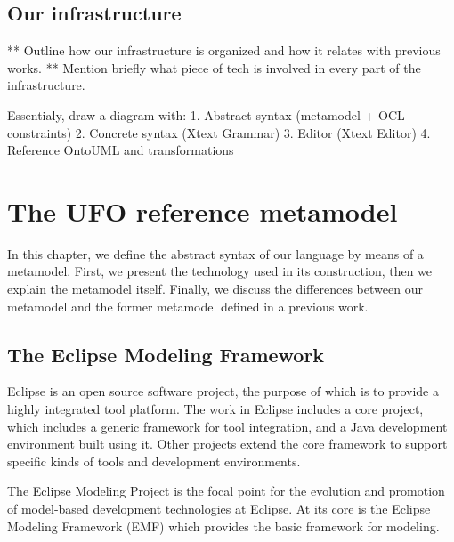 \documentclass[
  10pt,				%
  oneside,
  a4paper,			%
  brazilian,
  english
]{abntex2}
\begin{document}
%

\section{Our infrastructure}

** Outline how our infrastructure is organized and how it relates with previous works.
** Mention briefly what piece of tech is involved in every part of the infrastructure.

Essentialy, draw a diagram with:
1. Abstract syntax (metamodel + OCL constraints)
2. Concrete syntax (Xtext Grammar)
3. Editor (Xtext Editor)
4. Reference OntoUML and transformations

\chapter{The UFO reference metamodel}

In this chapter, we define the abstract syntax of our language by means of a
metamodel. First, we present the technology used in its construction, then we
explain the metamodel itself. Finally, we discuss the differences between our
metamodel and the former metamodel defined in a previous work.


\section{The Eclipse Modeling Framework}

Eclipse is an open source software project, the purpose of which is to provide
a highly integrated tool platform. The work in Eclipse includes a core project,
which includes a generic framework for tool integration, and a Java development
environment built using it. Other projects extend the core framework to support
specific kinds of tools and development environments.

The Eclipse Modeling Project is the focal point for the evolution and promotion
of model-based development technologies at Eclipse. At its core is the Eclipse
Modeling Framework (EMF) \cite{budinsky09} which provides the basic framework for modeling.
\end{document}
